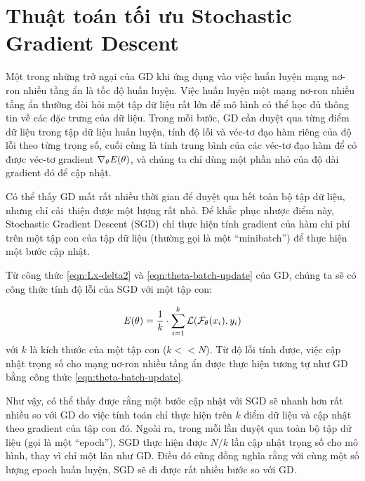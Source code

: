 \section{Thuật toán tối ưu Stochastic Gradient Descent}

Một trong những trở ngại của GD khi ứng dụng vào việc huấn luyện mạng nơ-ron nhiều tầng ẩn là tốc độ huấn luyện. Việc huấn luyện một mạng nơ-ron nhiều tầng ẩn thường đòi hỏi một tập dữ liệu rất lớn để mô hình có thể học đủ thông tin về các đặc trưng của dữ liệu. Trong mỗi bước, GD cần duyệt qua từng điểm dữ liệu trong tập dữ liệu huấn luyện, tính độ lỗi và véc-tơ đạo hàm riêng của độ lỗi theo từng trọng số, cuối cùng là tính trung bình của các véc-tơ đạo hàm để có được véc-tơ gradient $\nabla_{\theta}\mathbf{\it{E}}(\theta)$, và chúng ta chỉ dùng một phần nhỏ của độ dài gradient đó để cập nhật.

Có thể thấy GD mất rất nhiều thời gian để duyệt qua hết toàn bộ tập dữ liệu, nhưng chỉ cải thiện được một lượng rất nhỏ. Để khắc phục nhược điểm này, Stochastic Gradient Descent (SGD) chỉ thực hiện tính gradient của hàm chi phí trên một tập con của tập dữ liệu (thường gọi là một ``minibatch'') để thực hiện một bước cập nhật.

Từ công thức \ref{eqn:Lx-delta2} và \ref{eqn:theta-batch-update} của GD, chúng ta sẽ có công thức tính độ lỗi của SGD với một tập con:

\begin{equation}
	\label{eqn:E-minibatch}
	\mathbf{\it{E}(\theta)} = \frac{1}{k}\cdot \sum_{i=1}^{k}\mathcal{L}(\mathcal{F}_\theta( x_i), y_i)
\end{equation}
với $k$ là kích thước của một tập con ($k<<N$). Từ độ lỗi tính được, việc cập nhật trọng số cho mạng nơ-ron nhiều tầng ẩn được thực hiện tương tự như GD bằng công thức \ref{eqn:theta-batch-update}.

Như vậy, có thể thấy được rằng một bước cập nhật với SGD sẽ nhanh hơn rất nhiều so với GD do việc tính toán chỉ thực hiện trên $k$ điểm dữ liệu và cập nhật theo gradient của tập con đó. Ngoài ra, trong mỗi lần duyệt qua toàn bộ tập dữ liệu (gọi là một ``epoch''), SGD thực hiện được $N/k$ lần cập nhật trọng số cho mô hình, thay vì chỉ một lân như GD. Điều đó cũng đồng nghĩa rằng với cùng một số lượng epoch huấn luyện, SGD sẽ đi được rất nhiều bước so với GD.

